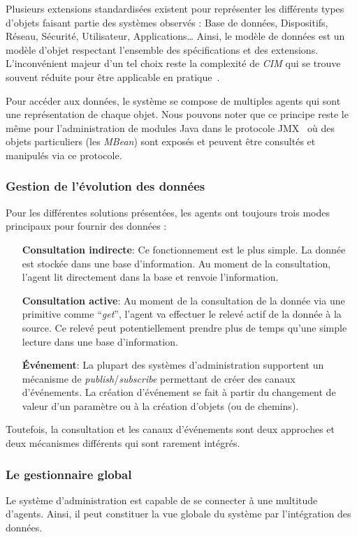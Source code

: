 Plusieurs extensions standardisées existent pour représenter les différents types d'objets faisant partie des systèmes observés : Base de données, Dispositifs, Réseau, Sécurité, Utilisateur, Applications\dots{} Ainsi, le modèle de données est un modèle d'objet respectant l'ensemble des spécifications et des extensions. L'inconvénient majeur d'un tel choix reste la complexité de \textit{CIM} qui se trouve souvent réduite pour être applicable en pratique~\cite{Lopez:datacenter}.

Pour accéder aux données, le système se compose de multiples agents qui sont une représentation de chaque objet. Nous pouvons noter que ce principe reste le même pour l'administration de modules Java dans le protocole JMX~\cite{Sun:JMX} où des objets particuliers (les \textit{MBean}) sont exposés et peuvent être consultés et manipulés via ce protocole.

\subsubsection{Gestion de l'évolution des données}
Pour les différentes solutions présentées, les agents ont toujours trois modes principaux pour fournir des données :
\begin{itemize}
	\item[\textbf{Consultation indirecte}: ] Ce fonctionnement est le plus simple. La donnée est stockée dans une base d'information. Au moment de la consultation, l'agent lit directement dans la base et renvoie l'information.
	\item[\textbf{Consultation active}: ] Au moment de la consultation de la donnée via une primitive comme \enquote{\it get}, l'agent va effectuer le relevé actif de la donnée à la source. Ce relevé peut potentiellement prendre plus de temps qu'une simple lecture dans une base d'information.
	\item[\textbf{Événement}: ] La plupart des systèmes d'administration supportent un mécanisme de \textit{publish}/\textit{subscribe} permettant de créer des canaux d'événements. La création d'événement se fait à partir du changement de valeur d'un paramètre ou à la création d'objets (ou de chemins).
\end{itemize}

Toutefois, la consultation et les canaux d'événements sont deux approches et deux mécanismes différents qui sont rarement intégrés.

\subsubsection{Le gestionnaire global}
Le système d'administration est capable de se connecter à une multitude d'agents. Ainsi, il peut constituer la vue globale du système par l'intégration des données.

